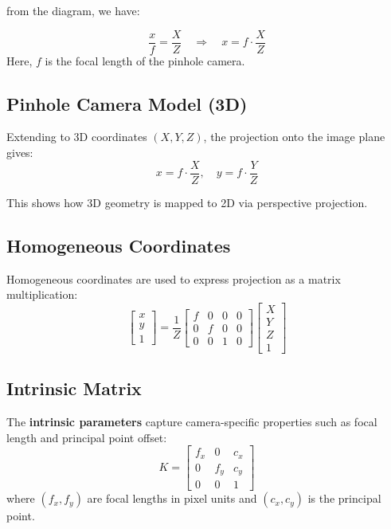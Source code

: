 \vspace{0.3cm}

\noindent from the diagram, we have:

\[
\frac{x}{f} = \frac{X}{Z}
\quad \Rightarrow \quad
x = f \cdot \frac{X}{Z}
\]
Here, $f$ is the focal length of the pinhole camera.



\subsection{Pinhole Camera Model (3D)}
Extending to 3D coordinates $(X,Y,Z)$, the projection onto the image plane gives:
\[
x = f \cdot \frac{X}{Z}, \quad
y = f \cdot \frac{Y}{Z}
\]

\noindent This shows how 3D geometry is mapped to 2D via perspective projection.

\subsection{Homogeneous Coordinates}
Homogeneous coordinates are used to express projection as a matrix multiplication:
\[
\begin{bmatrix}x \\ y \\ 1 \end{bmatrix}
= \frac{1}{Z}
\begin{bmatrix}
f & 0 & 0 & 0 \\
0 & f & 0 & 0 \\
0 & 0 & 1 & 0
\end{bmatrix}
\begin{bmatrix} X \\ Y \\ Z \\ 1 \end{bmatrix}
\]


\subsection{Intrinsic Matrix}
The \textbf{intrinsic parameters} capture camera-specific properties such as focal length and principal point offset:
\[
K =
\begin{bmatrix}
f_x & 0 & c_x \\
0 & f_y & c_y \\
0 & 0 & 1
\end{bmatrix}
\]
where $(f_x,f_y)$ are focal lengths in pixel units and $(c_x,c_y)$ is the principal point.

